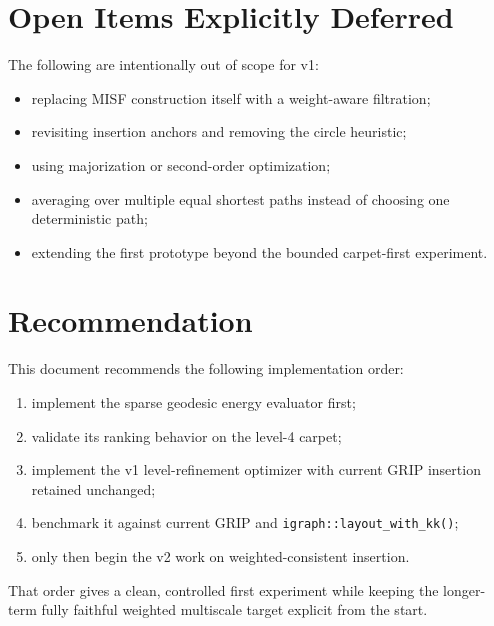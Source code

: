 \documentclass[11pt]{article}
\newcommand{\code}[1]{\begingroup\urlstyle{tt}\nolinkurl{#1}\endgroup}
\begin{document}
\section{Open Items Explicitly Deferred}

The following are intentionally out of scope for v1:
\begin{itemize}[leftmargin=1.4em]
  \item replacing MISF construction itself with a weight-aware filtration;
  \item revisiting insertion anchors and removing the circle heuristic;
  \item using majorization or second-order optimization;
  \item averaging over multiple equal shortest paths instead of choosing one
    deterministic path;
  \item extending the first prototype beyond the bounded carpet-first
    experiment.
\end{itemize}

\section{Recommendation}

This document recommends the following implementation order:
\begin{enumerate}[leftmargin=1.8em]
  \item implement the sparse geodesic energy evaluator first;
  \item validate its ranking behavior on the level-4 carpet;
  \item implement the v1 level-refinement optimizer with current GRIP insertion
    retained unchanged;
  \item benchmark it against current GRIP and \code{igraph::layout\_with\_kk()};
  \item only then begin the v2 work on weighted-consistent insertion.
\end{enumerate}

That order gives a clean, controlled first experiment while keeping the
longer-term fully faithful weighted multiscale target explicit from the start.
\end{document}
